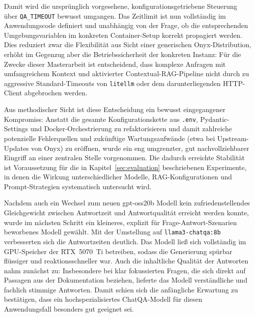 Damit wird die ursprünglich vorgesehene, konfigurationsgetriebene Steuerung über \texttt{QA\_TIMEOUT} bewusst umgangen.
Das Zeitlimit ist nun vollständig im Anwendungscode definiert und unabhängig von der Frage, ob die entsprechenden Umgebungsvariablen im konkreten Container-Setup korrekt propagiert werden.
Dies reduziert zwar die Flexibilität aus Sicht einer generischen Onyx-Distribution, erhöht im Gegenzug aber die Betriebssicherheit der konkreten Instanz:
Für die Zwecke dieser Masterarbeit ist entscheidend, dass komplexe Anfragen mit umfangreichem Kontext und aktivierter Contextual-RAG-Pipeline nicht durch zu aggressive Standard-Timeouts von \texttt{litellm} oder dem darunterliegenden HTTP-Client abgebrochen werden.

Aus methodischer Sicht ist diese Entscheidung ein bewusst eingegangener Kompromiss:
Anstatt die gesamte Konfigurationskette aus \texttt{.env}, Pydantic-Settings und Docker-Orchestrierung zu refaktorisieren und damit zahlreiche potenzielle Fehlerquellen und zukünftige Wartungsaufwände (etwa bei Upstream-Updates von Onyx) zu eröffnen, wurde ein eng umgrenzter, gut nachvollziehbarer Eingriff an einer zentralen Stelle vorgenommen.
Die dadurch erreichte Stabilität ist Voraussetzung für die in Kapitel~\ref{sec:evaluation} beschriebenen Experimente, in denen die Wirkung unterschiedlicher Modelle, RAG-Konfigurationen und Prompt-Strategien systematisch untersucht wird.

Nachdem auch ein Wechsel zum neuen gpt-oss20b Modell kein zufriedenstellendes Gleichgewicht zwischen Antwortzeit und Antwortqualität erreicht werden konnte, wurde im nächsten Schritt ein kleineres, explizit für Frage-Antwort-Szenarien beworbenes Modell gewählt.
Mit der Umstellung auf \texttt{llama3-chatqa:8b} verbesserten sich die Antwortzeiten deutlich.
Das Modell ließ sich vollständig im GPU-Speicher der RTX~5070~Ti betreiben, sodass die Generierung spürbar flüssiger und reaktionsschneller war.
Auch die inhaltliche Qualität der Antworten nahm zunächst zu:
Insbesondere bei klar fokussierten Fragen, die sich direkt auf Passagen aus der Dokumentation beziehen, lieferte das Modell verständliche und fachlich stimmige Antworten.
Damit schien sich die anfängliche Erwartung zu bestätigen, dass ein hochspezialisiertes ChatQA-Modell für diesen Anwendungsfall besonders gut geeignet sei.

